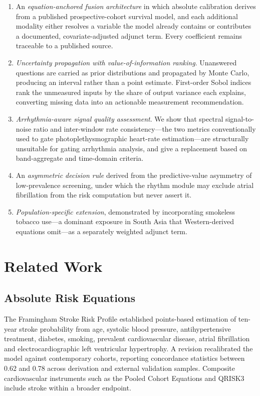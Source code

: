 \documentclass[conference]{IEEEtran}
\begin{document}
\begin{enumerate}
\item An \emph{equation-anchored fusion architecture} in which absolute
      calibration derives from a published prospective-cohort survival model, and
      each additional modality either resolves a variable the model already
      contains or contributes a documented, covariate-adjusted adjunct term. Every
      coefficient remains traceable to a published source.
\item \emph{Uncertainty propagation with value-of-information ranking}. Unanswered
      questions are carried as prior distributions and propagated by Monte Carlo,
      producing an interval rather than a point estimate. First-order Sobol indices
      rank the unmeasured inputs by the share of output variance each explains,
      converting missing data into an actionable measurement recommendation.
\item \emph{Arrhythmia-aware signal quality assessment}. We show that spectral
      signal-to-noise ratio and inter-window rate consistency---the two metrics
      conventionally used to gate photoplethysmographic heart-rate estimation---are
      structurally unsuitable for gating arrhythmia analysis, and give a
      replacement based on band-aggregate and time-domain criteria.
\item An \emph{asymmetric decision rule} derived from the predictive-value
      asymmetry of low-prevalence screening, under which the rhythm module may
      exclude atrial fibrillation from the risk computation but never assert it.
\item \emph{Population-specific extension}, demonstrated by incorporating
      smokeless tobacco use---a dominant exposure in South Asia that Western-derived
      equations omit---as a separately weighted adjunct term.
\end{enumerate}

\section{Related Work}

\subsection{Absolute Risk Equations}
The Framingham Stroke Risk Profile \cite{wolf1991} established points-based
estimation of ten-year stroke probability from age, systolic blood pressure,
antihypertensive treatment, diabetes, smoking, prevalent cardiovascular disease,
atrial fibrillation and electrocardiographic left ventricular hypertrophy. A
revision \cite{dufouil2017} recalibrated the model against contemporary cohorts,
reporting concordance statistics between 0.62 and 0.78 across derivation and
external validation samples. Composite cardiovascular instruments such as the
Pooled Cohort Equations and QRISK3 include stroke within a broader endpoint.
\end{document}

